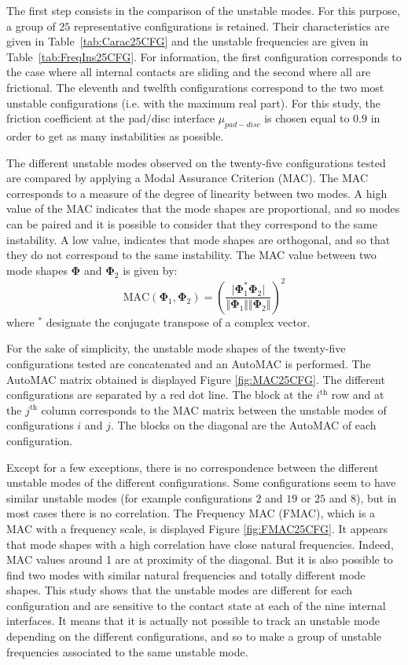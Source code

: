 \documentclass[final,1p]{elsarticle}
\newcommand{\bs}[1]{\boldsymbol{#1}}
\begin{document}
The first step consists in the comparison of the unstable modes. For this purpose, a group of $25$ representative configurations is retained. Their characteristics are given in Table~\ref{tab:Carac25CFG} and the unstable frequencies are given in Table~\ref{tab:FreqIns25CFG}. For information, the first configuration corresponds to the case where all internal contacts are sliding and the second where all are frictional.  The eleventh and twelfth configurations correspond to the two most unstable configurations (i.e. with the maximum real part). For this study, the friction coefficient at the pad/disc interface  $\mu_{pad-disc}$ is chosen equal to $0.9$ in order to get as many instabilities as possible.

The different unstable modes observed on the twenty-five configurations tested are compared by applying a Modal Assurance Criterion (MAC). The MAC corresponds to a measure of the degree of linearity between two modes. A high value of the MAC indicates that the mode shapes are proportional, and so modes can be paired and it is possible to consider that they correspond to the same instability. A low value, indicates that mode shapes are orthogonal, and so that they do not correspond to the same instability. The MAC value between two mode shapes $\bs{\Phi}$ and $\bs{\Phi}_2$ is given by: 
\begin{equation}
\text{MAC}(\bs{\Phi}_1,\bs{\Phi}_2)=\left( \frac{\vert \bs{\Phi}_1^{*} \bs{\Phi}_2 \vert}{\Vert \bs{\Phi}_1 \Vert \Vert \bs{\Phi}_2 \Vert}\right) ^2
\label{eq:MAC}
\end{equation}
where $^{*}$ designate the conjugate transpose of a complex vector. 

For the sake of simplicity, the unstable mode shapes of the twenty-five configurations tested are concatenated and an AutoMAC is performed. The AutoMAC matrix obtained is displayed Figure \ref{fig:MAC25CFG}. The different configurations are separated by a red dot line. The block at the $i^{\text{th}}$ row and at the $j^{\text{th}}$ column corresponds to the MAC matrix between the unstable modes of configurations $i$ and $j$. The blocks on the diagonal are the AutoMAC of each configuration. 

Except for a few exceptions, there is no correspondence between the different unstable modes of the different configurations. Some configurations seem to have similar unstable modes (for example configurations $2$ and $19$ or $25$ and $8$), but in most cases there is no correlation. The Frequency MAC (FMAC), which is a MAC with a frequency scale, is displayed Figure \ref{fig:FMAC25CFG}. It appears that mode shapes with a high correlation have close natural frequencies. Indeed, MAC values around 1 are at proximity of the diagonal. But it is also possible to find two modes with similar natural frequencies and totally different mode shapes. This study shows that the unstable modes are different for each configuration and are sensitive to the contact state at each of the nine internal interfaces. It means that it is actually not possible to track an unstable mode depending on the different configurations, and so to make a group of unstable frequencies associated to the same unstable mode. 
\end{document}
